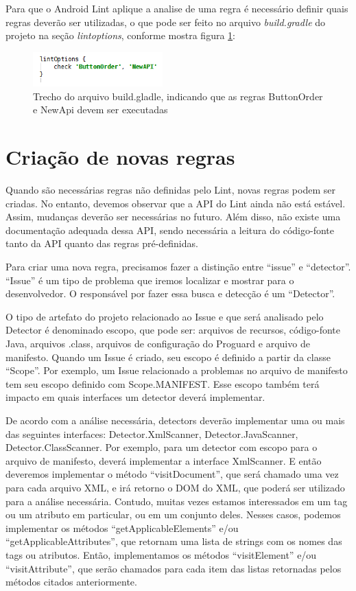 Para que o Android Lint aplique a analise de uma regra é necessário definir quais 
regras deverão ser utilizadas, o que pode ser feito no arquivo {\it build.gradle} do 
projeto na seção {\it lintoptions}, conforme mostra figura \ref{lintoptions}:

\begin{figure}[h]
    \centering
    \includegraphics[width=5cm]{img/lintoptions.png}
    \caption{Trecho do arquivo build.gladle, indicando que as regras ButtonOrder e 
    NewApi devem ser executadas}
    \label{lintoptions}
\end{figure}

\section{Criação de novas regras}

Quando são necessárias regras não definidas pelo Lint, novas regras podem ser criadas. 
No entanto, devemos observar que a API do Lint ainda não está estável. Assim, mudanças 
deverão ser necessárias no futuro. Além disso, não existe uma documentação adequada 
dessa API, sendo necessária a leitura do código-fonte tanto da API quanto das regras 
pré-definidas.

Para criar uma nova regra, precisamos fazer a distinção entre “issue” e “detector”. 
“Issue” é um tipo de problema que iremos localizar e mostrar para o desenvolvedor. 
O responsável por fazer essa busca e detecção é um “Detector”.

O tipo de artefato do projeto relacionado ao Issue e que será analisado pelo 
Detector é denominado escopo, que pode ser: arquivos de recursos, código-fonte Java, 
arquivos .class, arquivos de configuração do Proguard e arquivo de manifesto. Quando 
um Issue é criado, seu escopo é definido a partir da classe “Scope”. Por exemplo, 
um Issue relacionado a problemas no arquivo de manifesto tem seu escopo definido 
com Scope.MANIFEST. Esse escopo também terá impacto em quais interfaces um detector 
deverá implementar.

De acordo com a análise necessária, detectors deverão implementar uma ou mais das 
seguintes interfaces: Detector.XmlScanner, Detector.JavaScanner, Detector.ClassScanner. 
Por exemplo, para um detector com escopo para o arquivo de manifesto, deverá implementar 
a interface XmlScanner. E então deveremos implementar o método “visitDocument”, que será 
chamado uma vez para cada arquivo XML, e irá retorno o DOM do XML, que poderá ser utilizado 
para a análise necessária. Contudo, muitas vezes estamos interessados em um tag ou um atributo 
em particular, ou em um conjunto deles. Nesses casos, podemos implementar os métodos 
“getApplicableElements” e/ou “getApplicableAttributes”, que retornam uma lista de strings 
com os nomes das tags ou atributos. Então, implementamos os métodos “visitElement” e/ou 
“visitAttribute”, que serão chamados para cada item das listas retornadas pelos métodos 
citados anteriormente.

